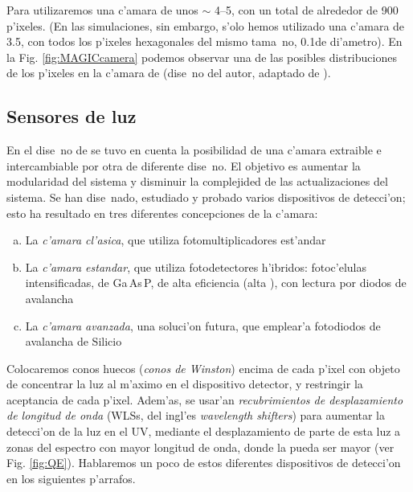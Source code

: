 \MAGICcamerafig

Para \MAGIC utilizaremos una c'amara de unos $\sim$ 4\deg--5\deg, con
un total de alrededor de 900 p'ixeles. (En las simulaciones, sin
embargo, s'olo hemos utilizado una c'amara de 3.5\deg, con todos los
p'ixeles hexagonales del mismo tama~no, 0.1\deg de di'ametro).  En la 
Fig. \ref{fig:MAGICcamera} podemos observar una de las posibles
distribuciones de los p'ixeles en la c'amara de \MAGIC (dise~no del
autor, adaptado de ).

\QuantumEfffig

\subsection{Sensores de luz}
%
En el dise~no de \MAGIC se tuvo en cuenta la posibilidad de una
c'amara extraible e intercambiable por otra de diferente dise~no. El
objetivo es aumentar la modularidad del sistema y disminuir la
complejided de las actualizaciones del sistema. Se han dise~nado,
estudiado y probado varios dispositivos de detecci'on; esto ha
resultado en tres diferentes concepciones de la c'amara:
%
\begin{enumerate}[a.]
\item La \emph{c'amara cl'asica}, que utiliza fotomultiplicadores est'andar
%
\item La \emph{c'amara estandar}, que utiliza fotodetectores h'ibridos:
fotoc'elulas intensificadas, de Ga\,As\,P, de alta eficiencia (alta
\QE), con lectura por diodos de avalancha
%
\item La \emph{c'amara avanzada}, una soluci'on futura, que emplear'a
fotodiodos de avalancha de Silicio
\end{enumerate}
%
Colocaremos conos huecos (\emph{conos de Winston}) encima de cada
p'ixel con objeto de concentrar la luz al m'aximo en el dispositivo
detector, y restringir la aceptancia de cada p'ixel. Adem'as, se
usar'an \emph{recubrimientos de desplazamiento de longitud de onda}
(WLSs, del ingl'es \emph{wavelength shifters}) para aumentar la
detecci'on de la luz \Cherenkov en el UV, mediante el desplazamiento
de parte de esta luz a zonas del espectro con mayor longitud de onda,
donde la \QE pueda ser mayor (ver Fig. \ref{fig:QE}). Hablaremos un
poco de estos diferentes dispositivos de detecci'on en los siguientes
p'arrafos.

\pixelreadoutfig

